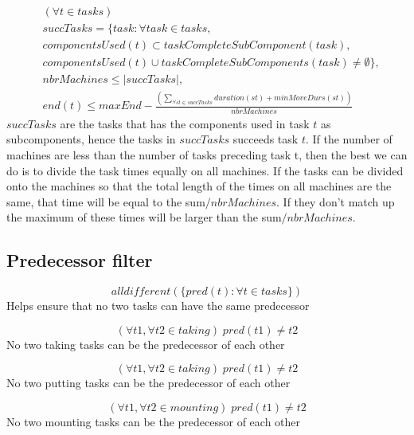\documentclass[10pt,a4paper]{report}
\begin{document}
\begin{equation}\label{eq:73}
\begin{aligned}
&(\forall t \in tasks)\\
&succTasks = \{task : \forall task \in tasks, \\
&componentsUsed(t) \subset taskCompleteSubComponent(task), \\
&componentsUsed(t) \cup taskCompleteSubComponents(task) \neq \emptyset\}, \\
&nbrMachines \le |succTasks|, \\
&end(t) \le maxEnd - \frac{\left(\sum_{\forall st \in succTasks}duration(st) + minMoveDurs(st)\right)}{nbrMachines}
\end{aligned}
\end{equation}
$succTasks$ are the tasks that has the components used in task $t$ as subcomponents, hence the tasks in $succTasks$ succeeds task $t$. If the number of machines are less than the number of tasks preceding task t, then the best we can do is to divide the task times equally on all machines. If the tasks can be divided onto the machines so that the total length of the times on all machines are the same, that time will be equal to the sum$/nbrMachines$. If they don't match up the maximum of these times will be larger than the sum$/nbrMachines$.


\subsection*{Predecessor filter}
\begin{equation}\label{eq:74}
alldifferent(\{pred(t) : \forall t \in tasks\})
\end{equation}
Helps ensure that no two tasks can have the same predecessor

\begin{equation}\label{eq:75}
(\forall t1, \forall t2 \in taking) \; pred(t1) \neq t2
\end{equation}
No two taking tasks can be the predecessor of each other

\begin{equation}\label{eq:76}
(\forall t1, \forall t2 \in taking) \; pred(t1) \neq t2
\end{equation}
No two putting tasks can be the predecessor of each other

\begin{equation}\label{eq:77}
( \forall t1, \forall t2 \in mounting) \; pred(t1) \neq t2
\end{equation}
No two mounting tasks can be the predecessor of each other
\end{document}
